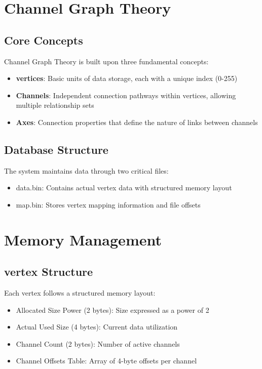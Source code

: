 \section{Channel Graph Theory}\label{Sec:Theory}
\subsection{Core Concepts}
Channel Graph Theory is built upon three fundamental concepts:
\begin{itemize}
    \item \textbf{vertices}: Basic units of data storage, each with a unique index (0-255)
    \item \textbf{Channels}: Independent connection pathways within vertices, allowing multiple relationship sets
    \item \textbf{Axes}: Connection properties that define the nature of links between channels
\end{itemize}

\subsection{Database Structure}
The system maintains data through two critical files:
\begin{itemize}
    \item data.bin: Contains actual vertex data with structured memory layout
    \item map.bin: Stores vertex mapping information and file offsets
\end{itemize}

\section{Memory Management}\label{Sec:Memory}
\subsection{vertex Structure}
Each vertex follows a structured memory layout:
\begin{itemize}
    \item Allocated Size Power (2 bytes): Size expressed as a power of 2
    \item Actual Used Size (4 bytes): Current data utilization
    \item Channel Count (2 bytes): Number of active channels
    \item Channel Offsets Table: Array of 4-byte offsets per channel
\end{itemize}

